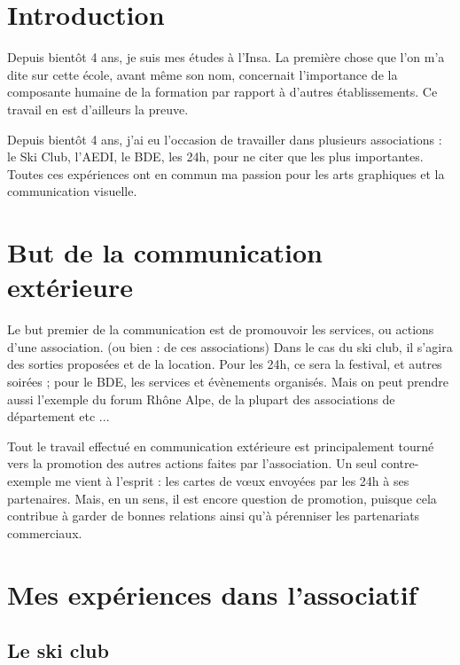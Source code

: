 
\section {Introduction}

    Depuis bientôt 4 ans, je suis mes études à l'Insa.
    La première chose que l'on m'a dite sur cette école, avant même son nom, concernait  l'importance de la composante humaine de la formation par rapport à d'autres établissements. Ce travail en est d'ailleurs la preuve.

    Depuis bientôt 4 ans, j'ai eu l'occasion de travailler dans plusieurs associations : le Ski Club, l'AEDI, le BDE, les 24h,  pour ne citer que les plus importantes.
    Toutes ces expériences ont en commun ma passion pour les arts graphiques et la communication visuelle.

        
    
\section{But de la communication extérieure}

    Le but premier de la communication est de promouvoir les services, ou actions d'une association.  (ou bien : de ces associations)
    Dans le cas du ski club, il s'agira des sorties proposées et de la location. Pour les 24h, ce sera la festival, et autres soirées ; pour le BDE, les services et évènements organisés.
    Mais on peut prendre aussi l'exemple du forum Rhône Alpe, de la plupart des associations de département etc ...

    Tout le travail effectué en communication extérieure est principalement tourné vers la promotion des autres actions faites par l'association.
    Un seul contre-exemple me vient à l'esprit : les cartes de vœux envoyées par les 24h à ses partenaires.  Mais, en un sens, il est encore question de promotion, puisque cela contribue à garder de bonnes relations ainsi qu'à pérenniser les partenariats commerciaux.


\section{Mes expériences dans l'associatif}

    \subsection{Le ski club}
        
